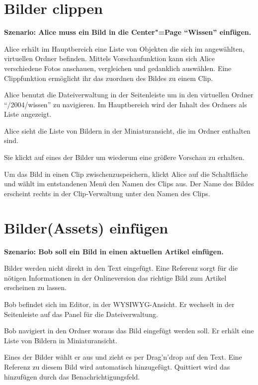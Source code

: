 \section{Bilder clippen}

\textbf{Szenario: Alice muss ein Bild in die Center"=Page "`Wissen"' einfügen.}


Alice erhält im Hauptbereich eine Liste von Objekten die sich im 
angewählten, virtuellen Ordner befinden. Mittels Vorschaufunktion kann 
sich Alice verschiedene Fotos anschauen, vergleichen und gedanklich 
auswählen. Eine Clippfunktion ermöglicht ihr das zuordnen des Bildes zu 
einem Clip.

\begin{compactenum}
  \item Alice benutzt die Dateiverwaltung in der Seitenleiste um in den 
  virtuellen Ordner "`/2004/wissen"' zu navigieren. Im Hauptbereich 
  wird der Inhalt des Ordners als Liste angezeigt. 
  \item Alice sieht die Liste von Bildern in der Miniaturansicht, die 
  im Ordner enthalten sind.
  \item Sie klickt auf eines der Bilder um wiederum eine größere 
  Vorschau zu erhalten.
  \item Um das Bild in einen Clip zwischenzuspeichern, klickt Alice auf 
  die Schaltfläche  und wählt im entstandenen Menü 
  den Namen des Clips aus. Der Name des Bildes erscheint rechts in der 
  Clip-Verwaltung unter den Namen des Clips.
\end{compactenum}

\section{Bilder(Assets) einfügen}

\textbf{Szenario: Bob soll ein Bild in einen aktuellen Artikel einfügen.}

Bilder werden nicht direkt in den Text eingefügt. Eine Referenz sorgt 
für die nötigen Informationen in der Onlineversion das richtige Bild 
zum Artikel erscheinen zu lassen.

\begin{compactenum}
  \item Bob befindet sich im Editor, in der WYSIWYG-Ansicht. Er 
  wechselt in der Seitenleiste auf das Panel für die Dateiverwaltung. 
  \item Bob navigiert in den Ordner woraus das Bild eingefügt werden 
  soll. Er erhält eine Liste von Bildern in Miniaturansicht. 
  \item Eines der Bilder wählt er aus und zieht es per Drag'n'drop auf 
  den Text. Eine Referenz zu diesem Bild wird automatisch hinzugefügt. 
  Quittiert wird das hinzufügen durch das Benachrichtigungsfeld.
\end{compactenum}

